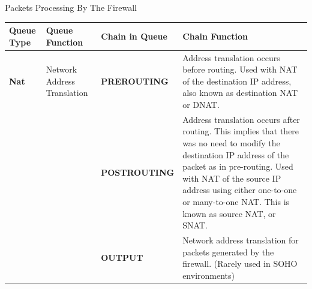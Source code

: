 \begin{frame}{Packets Processing By The Firewall}
\centering\fontsize{9.2}{11.1}\selectfont
\renewcommand{\arraystretch}{1.06}
\begin{tabular}{|Y{1.5cm}|Y{2.2cm}|Y{2.7cm}|Y{5.9cm}|}\hline
{}\color{white}\bfseries Queue Type&\color{white}\bfseries Queue Function&\color{white}\bfseries Chain in Queue&\color{white}\bfseries Chain Function\\\hline
\textcolor{CommandGreen}{\bfseries Nat}&Network Address Translation&\textcolor{WarningColor}{\bfseries PREROUTING}&Address translation occurs before routing. Used with NAT of the destination IP address, also known as destination NAT or DNAT.\\
&&\textcolor{WarningColor}{\bfseries POSTROUTING}&Address translation occurs after routing. This implies that there was no need to modify the destination IP address of the packet as in pre-routing. Used with NAT of the source IP address using either one-to-one or many-to-one NAT. This is known as source NAT, or SNAT.\\
&&\textcolor{WarningColor}{\bfseries OUTPUT}&Network address translation for packets generated by the firewall. (Rarely used in SOHO environments)\\\hline
\end{tabular}
\end{frame}

